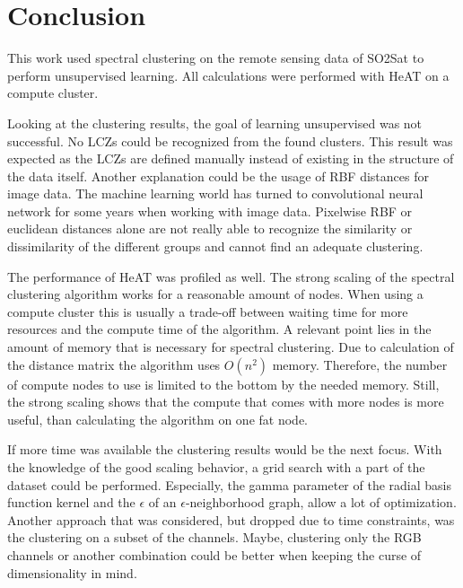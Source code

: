 \section{Conclusion}
\label{sec:conclusion}
This work used spectral clustering on the remote sensing data of SO2Sat to perform unsupervised learning.
All calculations were performed with \gls{HeAT} on a compute cluster.

Looking at the clustering results, the goal of learning unsupervised was not successful.
No \glspl{LCZ} could be recognized from the found clusters.
This result was expected as the \glspl{LCZ}  are defined manually instead of existing in the structure of the data itself.
Another explanation could be the usage of RBF distances for image data. The machine learning world has turned to convolutional neural network
for some years when working with image data. Pixelwise RBF or euclidean distances alone are not really able to recognize the similarity or dissimilarity
of the different groups and cannot find an adequate clustering.

The performance of \gls{HeAT} was profiled as well.
The strong scaling of the spectral clustering algorithm works for a reasonable amount of nodes.
When using a compute cluster this is usually a trade-off between waiting time for more resources and the compute time of the algorithm.
A relevant point lies in the amount of memory that is necessary for spectral clustering. Due to calculation of the distance matrix
the algorithm uses \(O(n^2)\) memory.
Therefore, the number of compute nodes to use is limited to the bottom by the needed memory.
Still, the strong scaling shows that the compute that comes with more nodes is more useful, than calculating the algorithm on one fat node.

If more time was available the clustering results would be the next focus.
With the knowledge of the good scaling behavior, a grid search with a part of the dataset could be performed.
Especially, the gamma parameter of the radial basis function kernel and the \(\epsilon\) of an \(\epsilon\)-neighborhood graph, allow a lot of optimization.
Another approach that was considered, but dropped due to time constraints, was the clustering on a subset of the channels.
Maybe, clustering only the RGB channels or another combination could be better when keeping the curse of dimensionality in mind.
